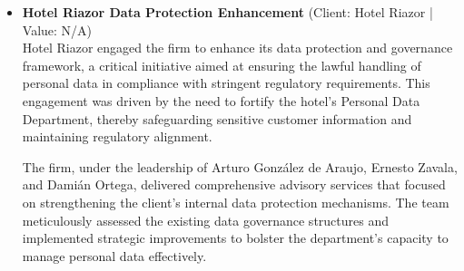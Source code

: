 \documentclass[11pt]{article}
\begin{document}
\begin{itemize}
The legal complexity of this matter was underscored by the need to navigate various data protection regulations and ensure that Biocodex's framework met all compliance requirements. As a result of the firm's intervention, Biocodex significantly reduced its regulatory exposure and strengthened its internal controls. This transformation embedded data protection as a fundamental component of the company's compliance and governance culture, demonstrating the firm's capability to deliver strategic and impactful legal solutions. This matter exemplifies the firm's expertise in crafting tailored compliance frameworks that align with a client's operational and regulatory landscape.
\item \textbf{Hotel Riazor Data Protection Enhancement} (Client: Hotel Riazor | Value: N/A)\\ Hotel Riazor engaged the firm to enhance its data protection and governance framework, a critical initiative aimed at ensuring the lawful handling of personal data in compliance with stringent regulatory requirements. This engagement was driven by the need to fortify the hotel's Personal Data Department, thereby safeguarding sensitive customer information and maintaining regulatory alignment. 

The firm, under the leadership of Arturo González de Araujo, Ernesto Zavala, and Damián Ortega, delivered comprehensive advisory services that focused on strengthening the client's internal data protection mechanisms. The team meticulously assessed the existing data governance structures and implemented strategic improvements to bolster the department's capacity to manage personal data effectively. 


\end{itemize}
\end{document}
